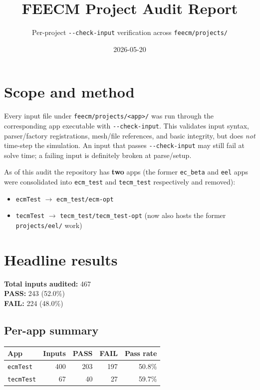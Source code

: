 \documentclass[10pt,letterpaper]{article}
\title{FEECM Project Audit Report}
\author{Per-project \texttt{-{}-check-input} verification across \texttt{feecm/projects/}}
\date{2026-05-20}
\newcommand{\code}[1]{\texttt{\small #1}}
\begin{document}
\maketitle

\section{Scope and method}
Every input file under \code{feecm/projects/<app>/} was run through the corresponding app executable with \code{-{}-check-input}. This validates input syntax, parser/factory registrations, mesh/file references, and basic integrity, but does \emph{not} time-step the simulation. An input that passes \code{-{}-check-input} may still fail at solve time; a failing input is definitely broken at parse/setup.

As of this audit the repository has \textbf{two} apps (the former \code{ec\_beta} and \code{eel} apps were consolidated into \code{ecm\_test} and \code{tecm\_test} respectively and removed):
\begin{itemize}
  \item \code{ecmTest} $\to$ \code{ecm\_test/ecm-opt}
  \item \code{tecmTest} $\to$ \code{tecm\_test/tecm\_test-opt} (now also hosts the former \code{projects/eel/} work)
\end{itemize}

\section{Headline results}
\textbf{Total inputs audited:} 467\\
\textbf{PASS:} 243 (\textcolor{passgreen}{52.0\%})\\
\textbf{FAIL:} 224 (\textcolor{failred}{48.0\%})\\

\subsection{Per-app summary}
\begin{tabular}{lrrrr}
\toprule
App & Inputs & PASS & FAIL & Pass rate \\
\midrule
\code{ecmTest} & 400 & 203 & 197 & 50.8\% \\
\code{tecmTest} & 67 & 40 & 27 & 59.7\% \\
\bottomrule
\end{tabular}
\end{document}
